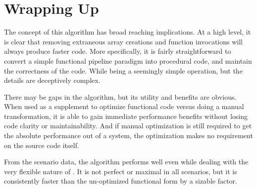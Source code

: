 \section{Wrapping Up}
The concept of this algorithm has broad reaching implications.  At a high level, it is clear that removing extraneous array creations and function invocations will always produce faster code.  More specifically, it is fairly straightforward to convert a simple functional pipeline paradigm into procedural code, and maintain the correctness of the code. While being a seemingly simple operation, but the details are deceptively complex.

There may be gaps in the algorithm, but its utility and benefits are obvious.  When used as a supplement to optimize functional code versus doing a manual transformation, it is able to gain immediate performance benefits without losing code clarity or maintainability.  And if manual optimization is still required to get the absolute performance out of a system, the optimization makes no requirement on the source code itself.    

From the scenario data, the algorithm performs well even while dealing with the very flexible nature of \javascript. It is not perfect or maximal in all scenarios, but it is consistently faster than the un-optimized functional form by a sizable factor.